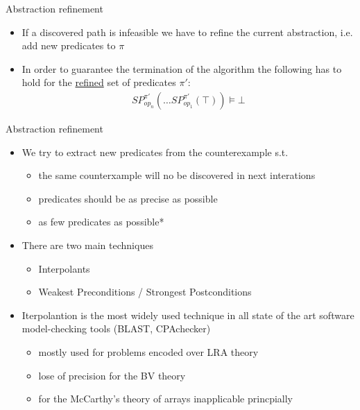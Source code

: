 \begin{frame}{Abstraction refinement}
\begin{itemize}
  \itemsep 1em   
  \item If a discovered path is infeasible we have to refine the current
  abstraction, i.e. add new predicates to $\pi$
  
  \item In order to guarantee the termination of the algorithm the following 
  has to hold for the \underline{refined} set of predicates $\pi'$:
  \begin{align*}
      SP_{op_n}^{\pi'}(\ldots SP_{op_1}^{\pi'}(\top)) \models \bot
    \end{align*}
    
\end{itemize}
\end{frame}


\begin{frame}{Abstraction refinement}
\begin{itemize}
  \itemsep 1em  
  \item We try to extract new predicates from the counterexample s.t.
    \begin{itemize}
      \itemsep 0.1cm
      \item the same counterxample will no be discovered in next interations
      \item predicates should be as precise as possible
      \item as few predicates as possible*
    \end{itemize}  
  \item There are two main techniques
    \begin{itemize}
      \itemsep 0.1cm
      \item Interpolants
      \item Weakest Preconditions / Strongest Postconditions
    \end{itemize}  
  \item Iterpolantion is the most widely used technique in all state of the art
  software model-checking tools (BLAST, CPAchecker)
    \begin{itemize}
      \itemsep 0.1cm
      \item mostly used for problems encoded over LRA theory
      \item lose of precision for the BV theory
      \item for the McCarthy's theory of arrays inapplicable princpially
    \end{itemize}        
\end{itemize}
\end{frame}

